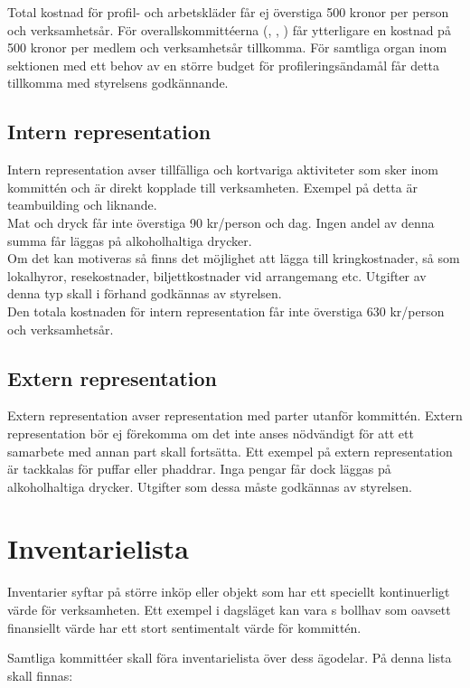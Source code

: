 \documentclass[11pt, includeaddress]{classes/cthit}
\begin{document}
Total kostnad för profil- och arbetskläder får ej överstiga 500 kronor per person och verksamhetsår. För overallskommittéerna (\NOLLKIT{}, \PRIT{}, \SEXIT{}) får ytterligare en kostnad på 500 kronor per medlem och verksamhetsår tillkomma. För samtliga organ inom sektionen med ett behov av en större budget för profileringsändamål får detta tillkomma med styrelsens godkännande.

\subsection{Intern representation}
Intern representation avser tillfälliga och kortvariga aktiviteter som sker inom kommittén och är direkt kopplade till verksamheten. Exempel på detta är teambuilding och liknande. \\

Mat och dryck får inte överstiga 90 kr/person och dag. Ingen andel av denna summa får läggas på alkoholhaltiga drycker. \\

Om det kan motiveras så finns det möjlighet att lägga till kringkostnader, så som lokalhyror, resekostnader,
biljettkostnader vid arrangemang etc. Utgifter av denna typ skall i förhand godkännas av styrelsen. \\

Den totala kostnaden för intern representation får inte överstiga 630 kr/person och verksamhetsår.

\subsection{Extern representation}
Extern representation avser representation med parter utanför kommittén. Extern representation bör ej förekomma om det inte anses nödvändigt för att ett samarbete med annan part skall fortsätta. Ett exempel på extern representation är tackkalas för puffar eller phaddrar. Inga pengar får dock läggas på alkoholhaltiga drycker. Utgifter som dessa måste godkännas av styrelsen.


\section{Inventarielista}
Inventarier syftar på större inköp eller objekt som har ett speciellt kontinuerligt värde för verksamheten. Ett exempel i dagsläget kan vara \NOLLKIT{}s bollhav som oavsett finansiellt värde har ett stort sentimentalt värde för kommittén.

Samtliga kommittéer skall föra inventarielista över dess ägodelar. På denna lista skall finnas:
\end{document}
